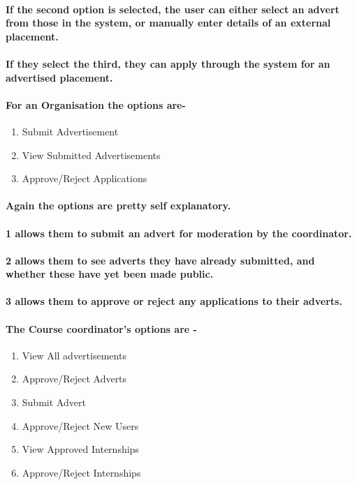 \documentclass{l3deliverable}
\begin{document}
\paragraph*{\textmd{If the second option is selected, the user can either select
an advert from those in the system, or manually enter details of an
external placement.}}


\paragraph*{\textmd{If they select the third, they can apply through the system
for an advertised placement.}}


\paragraph*{\textmd{For an Organisation the options are-}}
\begin{enumerate}
\item Submit Advertisement
\item View Submitted Advertisements
\item Approve/Reject Applications
\end{enumerate}

\paragraph*{\textmd{Again the options are pretty self explanatory.}}


\paragraph*{\textmd{1 allows them to submit an advert for moderation by the coordinator.}}


\paragraph*{\textmd{2 allows them to see adverts they have already submitted,
and whether these have yet been made public.}}


\paragraph*{\textmd{3 allows them to approve or reject any applications to their
adverts.}}


\paragraph{\textmd{The Course coordinator's options are -}}
\begin{enumerate}
\item View All advertisements
\item Approve/Reject Adverts
\item Submit Advert 
\item Approve/Reject New Users 
\item View Approved Internships
\item Approve/Reject Internships 
\end{enumerate}
\end{document}
